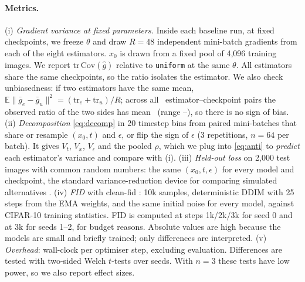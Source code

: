 \paragraph{Metrics.}
(i) \emph{Gradient variance at fixed parameters.} Inside each baseline run, at fixed checkpoints, we freeze
$\theta$ and draw $R=48$ independent mini-batch gradients from each of the eight estimators. $x_0$ is drawn from a
fixed pool of 4,096 training images. We report $\mathrm{tr}\,\mathrm{Cov}(\hat g)$ relative to \texttt{uniform}
at the same $\theta$. All estimators share the same checkpoints, so the ratio isolates the estimator. We also check
unbiasedness: if two estimators have the same mean, $\mathbb E\|\bar g_e-\bar g_u\|^2=(\mathrm{tr}_e+\mathrm{tr}_u)/R$;
across all \UnbiasN\ estimator--checkpoint pairs the observed ratio of the two sides has mean \UnbiasMean\
(range \UnbiasMin--\UnbiasMax), so there is no sign of bias.
(ii) \emph{Decomposition} \eqref{eq:decomp} in 20 timestep bins from paired mini-batches that share or
resample $(x_0,t)$ and $\epsilon$, or flip the sign of $\epsilon$ (3 repetitions, $n=64$ per batch). It gives
$V_t$, $V_x$, $V_\epsilon$ and the pooled $\rho$, which we plug into \eqref{eq:anti} to \emph{predict} each estimator's
variance and compare with (i).
(iii) \emph{Held-out loss} on 2,000 test images with common random numbers: the same $(x_0,t,\epsilon)$ for every
model and checkpoint, the standard variance-reduction device for comparing simulated alternatives
\citep{glasserman2003}.
(iv) \emph{FID} \citep{heusel2017fid} with clean-fid \citep{parmar2022cleanfid}: 10k samples, deterministic DDIM
\citep{song2021ddim} with 25 steps from the EMA weights, and the same initial noise for every model, against
CIFAR-10 training statistics. FID is computed at steps 1k/2k/3k for seed 0 and at 3k for seeds 1--2, for budget
reasons. Absolute values are high because the models are small and briefly trained; only differences are
interpreted.
(v) \emph{Overhead}: wall-clock per optimiser step, excluding evaluation.
Differences are tested with two-sided Welch $t$-tests over seeds. With $n=3$ these tests have low power, so
we also report effect sizes.
